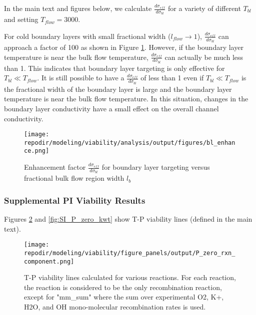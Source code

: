 
In the main text and figures below, we calculate $\frac{d\sigma_{eff}}{d\sigma_{bl}}$ for a variety of different $T_{bl}$ and setting $T_{flow} = 3000$.

For cold boundary layers with small fractional width ($l_{flow}\rightarrow1$), $\frac{d\sigma_{eff}}{d\sigma_{bl}}$ can approach a factor of 100 as shown in Figure \ref{fig:SI_bl_enhance}. However, if the boundary layer temperature is near the bulk flow temperature, $\frac{d\sigma_{eff}}{d\sigma_{bl}}$ can actually be much less than 1. This indicates that boundary layer targeting is only effective for $T_{bl} \ll T_{flow}$. It is still possible to have a $\frac{d\sigma_{eff}}{d\sigma_{bl}}$ of less than 1 even if $T_{bl} \ll T_{flow}$ is the fractional width of the boundary layer is large and the  boundary layer temperature is near the bulk flow temperature. In this situation, changes in the boundary layer conductivity have a small effect on the overall channel conductivity.

\begin{figure}[h]
    \centering
    \texttt{[image: \\repodir/modeling/viability/analysis/output/figures/bl\_enhance.png]} 
    \caption{Enhancement factor $\frac{d\sigma_{eff}}{d\sigma_{bl}}$ for boundary layer targeting versus fractional bulk flow region width $l_b$}
    \label{fig:SI_bl_enhance}
\end{figure}

\clearpage

\subsubsection{Supplemental PI Viability Results}

Figures \ref{fig:SI_P_zero_rxn_component} and \ref{fig:SI_P_zero_kwt} show T-P viability lines (defined in the main text). 

\begin{figure}[h]
    \centering
    \texttt{[image: \\repodir/modeling/viability/figure\_panels/output/P\_zero\_rxn\_component.png]} 
    \caption{T-P viability lines calculated for various reactions. For each reaction, the reaction is considered to be the only recombination reaction, except for "mm\_sum" where the sum over experimental O2, K+, H2O, and OH mono-molecular recombination rates is used.}
    \label{fig:SI_P_zero_rxn_component}
\end{figure}


